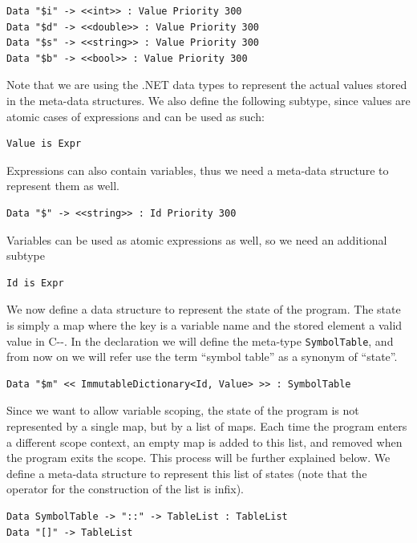 \begin{lstlisting}
Data "$i" -> <<int>> : Value Priority 300
Data "$d" -> <<double>> : Value Priority 300
Data "$s" -> <<string>> : Value Priority 300
Data "$b" -> <<bool>> : Value Priority 300
\end{lstlisting}

\noindent
Note that we are using the .NET data types to represent the actual values stored in the meta-data structures. We also define the following subtype, since values are atomic cases of expressions and can be used as such:

\begin{lstlisting}
Value is Expr
\end{lstlisting}

\noindent
Expressions can also contain variables, thus we need a meta-data structure to represent them as well.

\begin{lstlisting}
Data "$" -> <<string>> : Id Priority 300
\end{lstlisting}

\noindent
Variables can be used as atomic expressions as well, so we need an additional subtype

\begin{lstlisting}
Id is Expr
\end{lstlisting}

\noindent
We now define a data structure to represent the state of the program. The state is simply a map where the key is a variable name and the stored element a valid value in C-{}-. In the declaration we will define the meta-type \texttt{SymbolTable}, and from now on we will refer use the term ``symbol table'' as a synonym of ``state''.

\begin{lstlisting}
Data "$m" << ImmutableDictionary<Id, Value> >> : SymbolTable 
\end{lstlisting}

\noindent
Since we want to allow variable scoping, the state of the program is not represented by a single map, but by a list of maps. Each time the program enters a different scope context, an empty map is added to this list, and removed when the program exits the scope. This process will be further explained below. We define a meta-data structure to represent this list of states (note that the operator for the construction of the list is infix).

\begin{lstlisting}
Data SymbolTable -> "::" -> TableList : TableList
Data "[]" -> TableList
\end{lstlisting}

